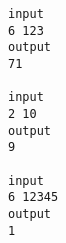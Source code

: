 \begin{verbatim}
input 
6 123 
output 
71 

input 
2 10 
output 
9

input 
6 12345 
output 
1 
\end{verbatim}